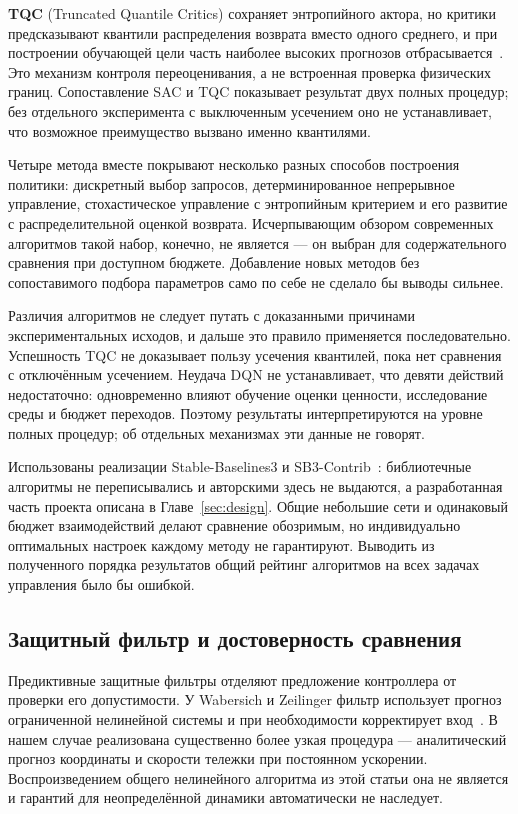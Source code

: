 \textbf{TQC} (Truncated Quantile Critics) сохраняет энтропийного актора, но критики предсказывают квантили распределения возврата вместо одного среднего, и при построении обучающей цели часть наиболее высоких прогнозов отбрасывается~\cite{kuznetsov}. Это механизм контроля переоценивания, а не встроенная проверка физических границ. Сопоставление SAC и TQC показывает результат двух полных процедур; без отдельного эксперимента с выключенным усечением оно не устанавливает, что возможное преимущество вызвано именно квантилями.

Четыре метода вместе покрывают несколько разных способов построения политики: дискретный выбор запросов, детерминированное непрерывное управление, стохастическое управление с энтропийным критерием и его развитие с распределительной оценкой возврата. Исчерпывающим обзором современных алгоритмов такой набор, конечно, не является — он выбран для содержательного сравнения при доступном бюджете. Добавление новых методов без сопоставимого подбора параметров само по себе не сделало бы выводы сильнее.

Различия алгоритмов не следует путать с доказанными причинами экспериментальных исходов, и дальше это правило применяется последовательно. Успешность TQC не доказывает пользу усечения квантилей, пока нет сравнения с отключённым усечением. Неудача DQN не устанавливает, что девяти действий недостаточно: одновременно влияют обучение оценки ценности, исследование среды и бюджет переходов. Поэтому результаты интерпретируются на уровне полных процедур; об отдельных механизмах эти данные не говорят.

Использованы реализации Stable-Baselines3 и SB3-Contrib~\cite{raffin,contrib}: библиотечные алгоритмы не переписывались и авторскими здесь не выдаются, а разработанная часть проекта описана в Главе~\ref{sec:design}. Общие небольшие сети и одинаковый бюджет взаимодействий делают сравнение обозримым, но индивидуально оптимальных настроек каждому методу не гарантируют. Выводить из полученного порядка результатов общий рейтинг алгоритмов на всех задачах управления было бы ошибкой.

\subsection{Защитный фильтр и достоверность сравнения}
Предиктивные защитные фильтры отделяют предложение контроллера от проверки его допустимости. У Wabersich и Zeilinger фильтр использует прогноз ограниченной нелинейной системы и при необходимости корректирует вход~\cite{wabersich}. В нашем случае реализована существенно более узкая процедура — аналитический прогноз координаты и скорости тележки при постоянном ускорении. Воспроизведением общего нелинейного алгоритма из этой статьи она не является и гарантий для неопределённой динамики автоматически не наследует.

